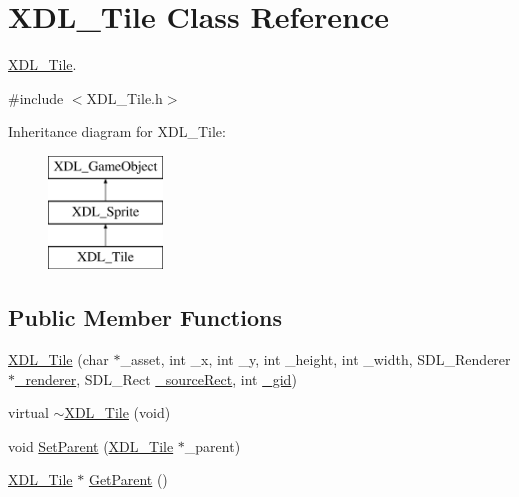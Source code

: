 \hypertarget{class_x_d_l___tile}{\section{X\-D\-L\-\_\-\-Tile Class Reference}
\label{class_x_d_l___tile}
}


\hyperlink{class_x_d_l___tile}{X\-D\-L\-\_\-\-Tile}.  




{\ttfamily \#include $<$X\-D\-L\-\_\-\-Tile.\-h$>$}

Inheritance diagram for X\-D\-L\-\_\-\-Tile\-:\begin{figure}[H]
\begin{center}
\leavevmode
\includegraphics[height=3.000000cm]{class_x_d_l___tile}
\end{center}
\end{figure}
\subsection*{Public Member Functions}
\begin{DoxyCompactItemize}
\item 
\hyperlink{class_x_d_l___tile_ad4e32024eec22bada0f17b0e9ec70008}{X\-D\-L\-\_\-\-Tile} (char $\ast$\-\_\-asset, int \-\_\-x, int \-\_\-y, int \-\_\-height, int \-\_\-width, S\-D\-L\-\_\-\-Renderer $\ast$\hyperlink{class_x_d_l___sprite_aedcf07ef73df095eb6cd9843870cd002}{\-\_\-renderer}, S\-D\-L\-\_\-\-Rect \hyperlink{class_x_d_l___sprite_a98c75cc4f4abc07331ad8de391a19675}{\-\_\-source\-Rect}, int \hyperlink{class_x_d_l___tile_aeb90ee0ab5ad7a0d061fd0e56bbbcee6}{\-\_\-gid})
\item 
virtual \hyperlink{class_x_d_l___tile_a15faa07f0ed8a8192ad7e83cb15878ef}{$\sim$\-X\-D\-L\-\_\-\-Tile} (void)
\item 
void \hyperlink{class_x_d_l___tile_ac520d114e26b99eea8762516a9e4fc0b}{Set\-Parent} (\hyperlink{class_x_d_l___tile}{X\-D\-L\-\_\-\-Tile} $\ast$\-\_\-parent)
\item 
\hyperlink{class_x_d_l___tile}{X\-D\-L\-\_\-\-Tile} $\ast$ \hyperlink{class_x_d_l___tile_a7000f395eee7999beffead93d979a83e}{Get\-Parent} ()
\end{DoxyCompactItemize}
